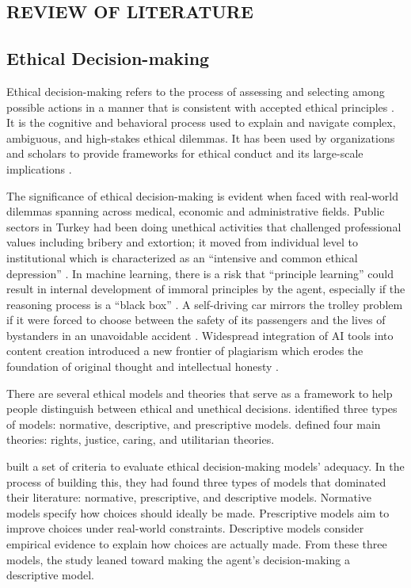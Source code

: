 \documentclass{icsthesis}
\begin{document}
\begin{mainmatter}
		
\section{REVIEW OF LITERATURE}
\subsection{Ethical Decision-making}
Ethical decision-making refers to the process of assessing and selecting among possible actions in a manner that is consistent with accepted ethical principles \citep{Pembi2024}. It is the cognitive and behavioral process used to explain and navigate complex, ambiguous, and high-stakes ethical dilemmas. It has been used by  organizations and scholars to provide frameworks for ethical conduct and its large-scale implications \citep{MacDougall2014}. 

The significance of ethical decision-making  is evident when faced with real-world dilemmas spanning across medical, economic and administrative fields. Public sectors in Turkey had been doing unethical activities that challenged professional values including bribery and extortion; it moved from individual level to institutional which is characterized as an “intensive and common ethical depression” \citep{CigerogluOztepe2019}.  In machine learning, there is a risk that “principle learning” could result in internal development of immoral principles by the agent, especially if the reasoning process is a “black box” \citep{Miranda2010}.  A self-driving car mirrors the trolley problem if it were forced to choose between the safety of its passengers and the lives of bystanders in an unavoidable accident \citep{KremerHerman2024}. Widespread integration of AI tools into content creation introduced a new frontier of plagiarism which erodes the foundation of original thought and intellectual honesty \citep{Joshi2025}. 

There are several ethical models and theories that serve as a framework to help people distinguish between ethical and unethical decisions. \citet{Whittier2006} identified three types of models: normative, descriptive, and prescriptive models. \citet{Pembi2024} defined four main theories: rights, justice, caring, and utilitarian theories.

\newpage
\citet{Whittier2006} built a set of criteria to evaluate ethical decision-making models' adequacy. In the process of building this, they had found three types of models that dominated their literature: normative, prescriptive, and descriptive models. Normative models specify how choices should ideally be made. Prescriptive models aim to improve choices under real-world constraints. Descriptive models consider empirical evidence to explain how choices are actually made. From these three models, the study leaned toward making the agent's decision-making a descriptive model.


\end{mainmatter}
\end{document}
